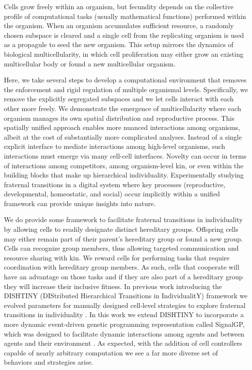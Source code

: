 Cells grow freely within an organism, but fecundity depends on the collective profile of computational tasks (usually mathematical functions) performed within the organism.
When an organism accumulates sufficient resource, a randomly chosen subspace is cleared and a single cell from the replicating organism is used as a propagule to seed the new organism.
This setup mirrors the dynamics of biological multicellularity, in which cell proliferation may either grow an existing multicellular body or found a new multicellular organism.

Here, we take several steps to develop a computational environment that removes the enforcement and rigid regulation of multiple organismal levels.
Specifically, we remove the explicitly segregated subspaces and we let cells interact with each other more freely.
We demonstrate the emergence of multicellularity where each organism manages its own spatial distribution and reproductive process.
This spatially unified approach enables more nuanced interactions among organisms, albeit at the cost of substantially more complicated analyses.
Instead of a single explicit interface to mediate interactions among high-level organisms, such interactions must emerge via many cell-cell interfaces.
Novelty can occur in terms of interactions among competitors, among organism-level kin, or even within the building blocks that make up hierarchical individuality.
Experimentally studying fraternal transitions in a digital system where key processes (reproductive, developmental, homeostatic, and social) occur implicitly within a unified framework can provide unique insights into nature.

We do provide some framework to facilitate fraternal transitions in individuality by allowing cells to readily designate distinct hereditary groups.
Offspring cells may either remain part of their parent's hereditary group or found a new group.
Cells can recognize group members, thus allowing targeted communication and resource sharing with kin.
We reward cells for performing tasks that require coordination with hereditary group members.
As such, cells that cooperate will have an advantage on those tasks and if they are also part of a hereditary group they will increase their inclusive fitness.
In previous work introducing the DISHTINY (DIStributed Hierarchical Transitions in IndividualitY) framework we evolved parameters for manually designed cell-level strategies to explore fraternal transitions in individuality \citep{moreno2019toward}.
In this work we extend DISHTINY to incorporate a more dynamic event-driven genetic programming representation called SignalGP, which was designed to facilitate dynamic interactions among agents and between agents and their environment \citep{lalejini2018evolving}.
As expected, with the addition of cell controllers capable of nearly arbitrary computation we see a far more diverse set of behaviors and strategies arise.


